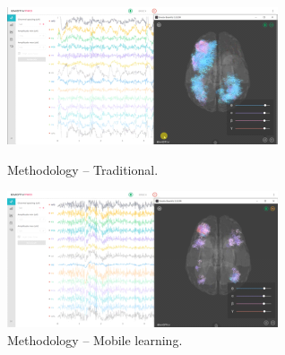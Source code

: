 \documentclass[english]{textolivre}
\begin{document}
\begin{figure}[h!]
 \centering
 \begin{minipage}{.45\textwidth}
 \includegraphics[width=\textwidth]{fig4.png}
 \caption{Methodology – Traditional.}
 \label{fig04}
 \end{minipage}%
 \qquad
 \begin{minipage}{0.45\textwidth}
 \includegraphics[width=\textwidth]{fig5.png}
 \caption{Methodology – Mobile learning.}
 \label{fig05}
 \end{minipage}%
\end{figure}
\end{document}
